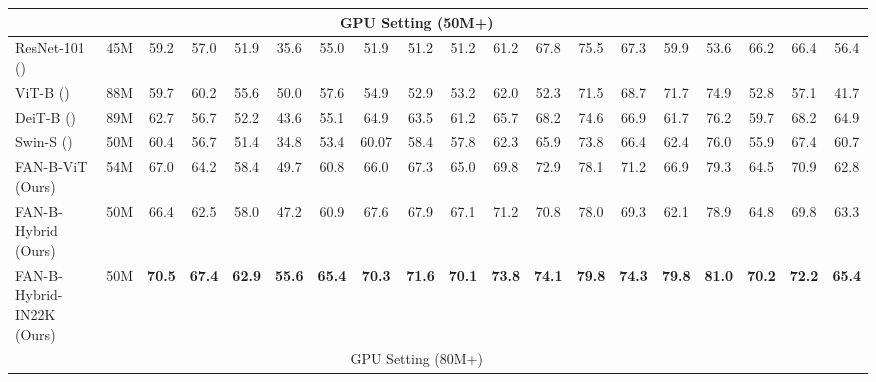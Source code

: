 \documentclass[nohyperref]{article}
\theoremstyle{plain}
\theoremstyle{definition}
\theoremstyle{remark}
\begin{document}
\begin{table*}[h]
\begin{savenotes}
\begin{minipage*}{1.0\textwidth}
{\begin{tabular}{l|c|c|cccc|cccc|cccc|cccc}
\multicolumn{18}{c}{GPU Setting (50M+)}  \\
\toprule
\multicolumn{1}{l|}{ResNet-101 (\citeauthor{he2019bag})} & 45M & \multicolumn{1}{c|}{59.2 } & 57.0 & 51.9 & 35.6 & \multicolumn{1}{c|}{55.0} & 51.9 & 51.2 & 51.2 & \multicolumn{1}{c|}{61.2} & 67.8 & 75.5 & 67.3 & \multicolumn{1}{c|}{59.9} & 53.6 & 66.2 & 66.4 & 56.4 \\
\multicolumn{1}{l|}{ViT-B (\citeauthor{dosovitskiy2020image})} & 88M &  \multicolumn{1}{c|}{59.7}    & 60.2 & 55.6 & 50.0 & \multicolumn{1}{c|}{57.6} & 54.9 & 52.9 & 53.2 & 62.0 & \multicolumn{1}{c}{52.3} & 71.5 & 68.7 & 71.7 & \multicolumn{1}{c}{74.9} & 52.8 & 57.1 & 41.7  \\
\multicolumn{1}{l|}{DeiT-B (\citeauthor{touvron2021training})} & 89M & \multicolumn{1}{c|}{62.7} & 56.7 & 52.2 & 43.6 & \multicolumn{1}{c|}{55.1} & 64.9 & 63.5 & 61.2 & \multicolumn{1}{c|}{65.7} & 68.2 & 74.6 & 66.9 & \multicolumn{1}{c|}{61.7} & 76.2 & 59.7 & 68.2 & 64.9 \\
\multicolumn{1}{l|}{Swin-S (\citeauthor{liu2021swin})} & 50M & \multicolumn{1}{c|}{60.4} & 56.7 & 51.4 & 34.8 & \multicolumn{1}{c|}{53.4} & 60.07 & 58.4 & 57.8 & \multicolumn{1}{c|}{62.3} & 65.9 & 73.8 & 66.4 & \multicolumn{1}{c|}{62.4} & 76.0 & 55.9 & 67.4 & 60.7 \\
\midrule
\multicolumn{1}{l|}{FAN-B-ViT (Ours)}& 54M &  \multicolumn{1}{c|}{{67.0} } & {64.2}  & {58.4}  & {49.7}  & \multicolumn{1}{c|}{{60.8}} & {66.0}  & {67.3}  & {65.0}  & \multicolumn{1}{c|}{{69.8}} & {72.9}  & {78.1}  & {71.2}  & \multicolumn{1}{c|}{{66.9}} & {79.3}  & {64.5}  & {70.9}  & {62.8}  \\
\multicolumn{1}{l|}{FAN-B-Hybrid (Ours)}& 50M &  \multicolumn{1}{c|}{{66.4} } & {62.5}  & {58.0}  & {47.2}  & \multicolumn{1}{c|}{{60.9}} & {67.6}  & {67.9}  & {67.1}  & \multicolumn{1}{c|}{{71.2}} & {70.8}  & {78.0}  & {69.3}  & \multicolumn{1}{c|}{{62.1}} & {78.9}  & {64.8}  & {69.8}  & {63.3}  \\
\multicolumn{1}{l|}{FAN-B-Hybrid-IN22K (Ours)}& 50M &  \multicolumn{1}{c|}{\textbf{70.5} } & \textbf{67.4}  & \textbf{62.9}  & \textbf{55.6}  & \multicolumn{1}{c|}{\textbf{65.4}} & \textbf{70.3}  & \textbf{71.6}  & \textbf{70.1}  & \multicolumn{1}{c|}{\textbf{73.8}} & \textbf{74.1}  & \textbf{79.8}  & \textbf{74.3}  & \multicolumn{1}{c|}{\textbf{79.8}} & \textbf{81.0}  & \textbf{70.2}  & \textbf{72.2}  & \textbf{65.4}  \\
\midrule
\multicolumn{18}{c}{GPU Setting (80M+)}  \\
\toprule

\end{tabular}}
\end{minipage*}
\end{savenotes}
\end{table*}
\end{document}
